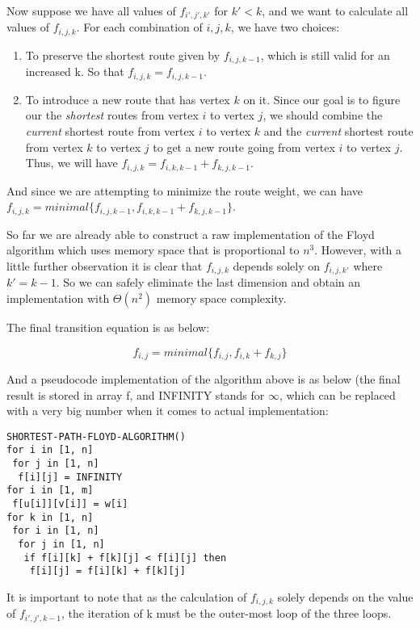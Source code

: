 \documentclass[a4paper,11pt,twocolumn]{article}
\begin{document}
Now suppose we have all values of $f_{i',j',k'}$ for $k' < k$, and we want to calculate all values of $f_{i,j,k}$. For each combination of $i, j, k$, we have two choices:

\begin{enumerate}

\item{To preserve the shortest route given by $f_{i,j,k-1}$, which is still valid for an increased k. So that $f_{i,j,k}=f_{i,j,k-1}$. }
\item{To introduce a new route that has vertex $k$ on it. Since our goal is to figure our the \emph{shortest} routes from vertex $i$ to vertex $j$, we should combine the \emph{current} shortest route from vertex $i$ to vertex $k$ and the \emph{current} shortest route from vertex $k$ to vertex $j$ to get a new route going from vertex $i$ to vertex $j$. Thus, we will have $f_{i,j,k}=f_{i,k,k-1}+f_{k,j,k-1}$. }

\end{enumerate} 

And since we are attempting to minimize the route weight, we can have $f_{i,j,k}=minimal\{f_{i,j,k-1},f_{i,k,k-1}+f_{k,j,k-1}\}$. 

So far we are already able to construct a raw implementation of the Floyd algorithm which uses memory space that is proportional to $n^3$. However, with a little further observation it is clear that $f_{i,j,k}$ depends solely on $f_{i,j,k'}$ where $k'=k-1$. So we can safely eliminate the last dimension and obtain an implementation with $\Theta(n^2)$ memory space complexity. 

The final transition equation is as below: 

$$f_{i,j}=minimal\{f_{i,j},f_{i,k}+f_{k,j}\}$$

And a pseudocode implementation of the algorithm above is as below (the final result is stored in array f, and INFINITY stands for $\infty$, which can be replaced with a very big number when it comes to actual implementation:

\begin{verbatim}
SHORTEST-PATH-FLOYD-ALGORITHM()
for i in [1, n]
 for j in [1, n]
  f[i][j] = INFINITY
for i in [1, m]
 f[u[i]][v[i]] = w[i]
for k in [1, n]
 for i in [1, n]
  for j in [1, n]
   if f[i][k] + f[k][j] < f[i][j] then
    f[i][j] = f[i][k] + f[k][j]
\end{verbatim}

It is important to note that as the calculation of $f_{i,j,k}$ solely depends on the value of $f_{i',j',k-1}$, the iteration of k must be the outer-most loop of the three loops. 
\end{document}

